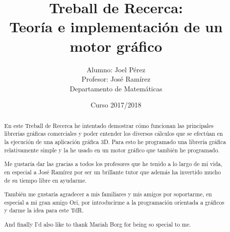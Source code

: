 \documentclass[12pt, a4paper]{report}
\title{Treball de Recerca:\\Teoría e implementación de un motor gráfico}
\date{Curso 2017/2018}
\author{Alumno: Joel Pérez\\Profesor: José Ramírez\\Departamento de Matemáticas}
\begin{document}
\lstset{language=C, basicstyle=\ttfamily}

\maketitle


\newpage


\begin{abstract}
  En este Treball de Recerca he intentado demostrar cómo funcionan las principales librerías gráficas comerciales y poder entender los diversos cálculos que se efectúan en la ejecución de una aplicación gráfica 3D. Para esto he programado una librería gráfica relativamente simple y la he usado en un motor gráfico que también he programado.
\end{abstract}

\renewcommand{\abstractname}{Agradecimientos}
\begin{abstract}
  Me gustaría dar las gracias a todos los profesores que he tenido a lo largo de mi vida, en especial a José Ramírez por ser un brillante tutor que además ha invertido mucho de su tiempo libre en ayudarme.

  También me gustaría agradecer a mis familiares y mis amigos por soportarme, en especial a mi gran amigo Ori, por introducirme a la programación orientada a gráficos y darme la idea para este TdR.

  And finally I'd also like to thank Mariah Borg for being so special to me.
\end{abstract}

\tableofcontents
















\end{document}
